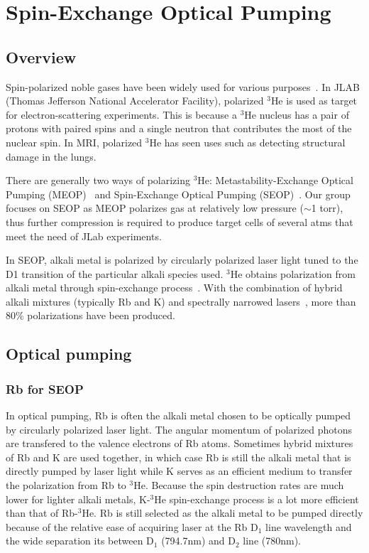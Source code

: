 \chapter{Spin-Exchange Optical Pumping}
\label{chap2}

\section{Overview}

Spin-polarized noble gases have been widely used for various purposes~\cite{PhysRevLett.71.959, PhysRevLett.89.242301, PhysRevLett.105.262302, PhysRevLett.107.072003}. In JLAB (Thomas Jefferson National Accelerator Facility), polarized $^{3}$He is used as target for electron-scattering experiments. This is because a $^{3}$He nucleus has a pair of protons with paired spins and a single neutron that contributes the most of the nuclear spin. In MRI, polarized $^{3}$He has seen uses such as detecting structural damage in the lungs.

There are generally two ways of polarizing $^{3}$He: Metastability-Exchange Optical Pumping (MEOP)~\cite{PhysRev.132.2561} and Spin-Exchange Optical Pumping (SEOP)~\cite{PhysRevC.36.2244, PhysRevA.44.3108, PhysRevLett.67.3219}. Our group focuses on SEOP as MEOP polarizes gas at relatively low pressure ($\sim$1 torr), thus further compression is required to produce target cells of several atms that meet the need of JLab experiments.

In SEOP, alkali metal is polarized by circularly polarized laser light tuned to the D1 transition of the particular alkali species used. $^{3}$He obtains polarization from alkali metal through spin-exchange process~\cite{PhysRevLett.5.373}. With the combination of hybrid alkali mixtures (typically Rb and K) and spectrally narrowed lasers~\cite{HapperPatent, PhysRevLett.91.123003}, more than 80\% polarizations have been produced.

\section{Optical pumping}

\subsection{Rb for SEOP}

In optical pumping, Rb is often the alkali metal chosen to be optically pumped by circularly polarized laser light. The angular momentum of polarized photons are transfered to the valence electrons of Rb atoms\cite{WalkerHapper}. Sometimes hybrid mixtures of Rb and K are used together, in which case Rb is still the alkali metal that is directly pumped by laser light while K serves as an efficient medium to transfer the polarization from Rb to $^{3}$He. Because the spin destruction rates are much lower for lighter alkali metals, K-$^{3}$He spin-exchange process is a lot more efficient than that of Rb-$^{3}$He. Rb is still selected as the alkali metal to be pumped directly because of the relative ease of acquiring laser at the Rb D$_1$ line wavelength and the wide separation its between D$_1$ (794.7nm) and D$_2$ line (780nm).

